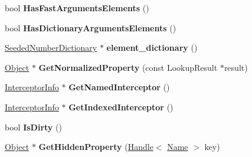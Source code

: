 \begin{DoxyCompactItemize}
\item 
\hypertarget{classv8_1_1internal_1_1_j_s_object_a031cd99f5593e0624d6e4010b8e7ba95}{}bool {\bfseries Has\+Fast\+Arguments\+Elements} ()\label{classv8_1_1internal_1_1_j_s_object_a031cd99f5593e0624d6e4010b8e7ba95}

\item 
\hypertarget{classv8_1_1internal_1_1_j_s_object_a1f7c29612c681ca5528fedd718b1910b}{}bool {\bfseries Has\+Dictionary\+Arguments\+Elements} ()\label{classv8_1_1internal_1_1_j_s_object_a1f7c29612c681ca5528fedd718b1910b}

\item 
\hypertarget{classv8_1_1internal_1_1_j_s_object_a489f0070216571aa2f39a33032186d27}{}\hyperlink{classv8_1_1internal_1_1_seeded_number_dictionary}{Seeded\+Number\+Dictionary} $\ast$ {\bfseries element\+\_\+dictionary} ()\label{classv8_1_1internal_1_1_j_s_object_a489f0070216571aa2f39a33032186d27}

\item 
\hypertarget{classv8_1_1internal_1_1_j_s_object_a0c77542af45f2fbe065208f5d806dab1}{}\hyperlink{classv8_1_1internal_1_1_object}{Object} $\ast$ {\bfseries Get\+Normalized\+Property} (const Lookup\+Result $\ast$result)\label{classv8_1_1internal_1_1_j_s_object_a0c77542af45f2fbe065208f5d806dab1}

\item 
\hypertarget{classv8_1_1internal_1_1_j_s_object_ac9430ceda4c1a2f280f7f42f880932df}{}\hyperlink{classv8_1_1internal_1_1_interceptor_info}{Interceptor\+Info} $\ast$ {\bfseries Get\+Named\+Interceptor} ()\label{classv8_1_1internal_1_1_j_s_object_ac9430ceda4c1a2f280f7f42f880932df}

\item 
\hypertarget{classv8_1_1internal_1_1_j_s_object_adb75ea2e8282ab687cee0d13b3728460}{}\hyperlink{classv8_1_1internal_1_1_interceptor_info}{Interceptor\+Info} $\ast$ {\bfseries Get\+Indexed\+Interceptor} ()\label{classv8_1_1internal_1_1_j_s_object_adb75ea2e8282ab687cee0d13b3728460}

\item 
\hypertarget{classv8_1_1internal_1_1_j_s_object_a492a35d8e581cb07b49e71a5f5ad5f06}{}bool {\bfseries Is\+Dirty} ()\label{classv8_1_1internal_1_1_j_s_object_a492a35d8e581cb07b49e71a5f5ad5f06}

\item 
\hypertarget{classv8_1_1internal_1_1_j_s_object_a528976d7ab77697325dfdc7c7a80c987}{}\hyperlink{classv8_1_1internal_1_1_object}{Object} $\ast$ {\bfseries Get\+Hidden\+Property} (\hyperlink{classv8_1_1internal_1_1_handle}{Handle}$<$ \hyperlink{classv8_1_1internal_1_1_name}{Name} $>$ key)\label{classv8_1_1internal_1_1_j_s_object_a528976d7ab77697325dfdc7c7a80c987}


\end{DoxyCompactItemize}
